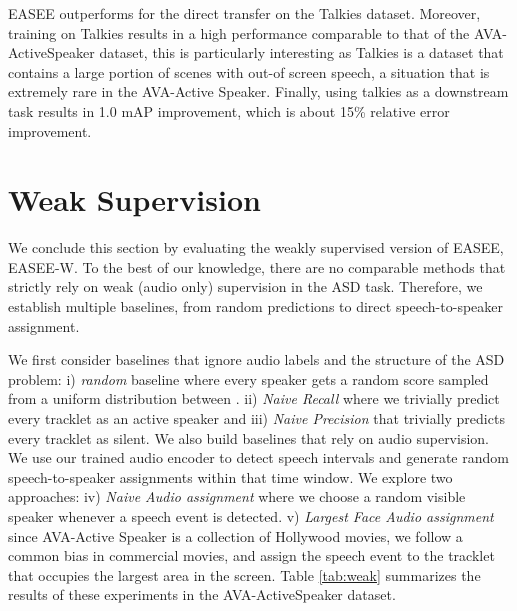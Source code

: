 \documentclass[10pt,twocolumn,letterpaper]{article}
\begin{document}
EASEE outperforms \cite{leon2021maas} for the direct transfer on the Talkies dataset. Moreover,  training on Talkies results in a high performance comparable to that of the AVA-ActiveSpeaker dataset, this is particularly interesting as Talkies is a dataset that contains a large portion of scenes with out-of screen speech, a situation that is extremely rare in the AVA-Active Speaker. Finally, using talkies as a downstream task results in 1.0 mAP improvement, which is about 15\% relative error improvement.












 
\section{Weak Supervision}
\label{subsec:weaksupervision}
We conclude this section by evaluating the weakly supervised version of EASEE, \ie EASEE-W. To the best of our knowledge, there are no comparable methods that strictly rely on weak (audio only) supervision in the ASD task. Therefore, we establish multiple baselines, from random predictions to direct speech-to-speaker assignment. 

We first consider baselines that ignore audio labels and the structure of the ASD problem: i) \textit{random} baseline where every speaker gets a random score sampled from a uniform distribution between .  ii) \textit{Naive Recall} where we trivially predict every tracklet as an active speaker and iii) \textit{Naive Precision} that trivially predicts every tracklet as silent. We also build baselines that rely on audio supervision. We use our trained audio encoder  to detect speech intervals and generate random speech-to-speaker assignments within that time window. We explore two approaches: iv) \textit{Naive Audio assignment} where we choose a random visible speaker whenever a speech event is detected. v) \textit{Largest Face Audio assignment} since AVA-Active Speaker is a collection of Hollywood movies, we follow a common bias in commercial movies, and assign the speech event to the tracklet that occupies the largest area in the screen. Table \ref{tab:weak} summarizes the results of these experiments in the AVA-ActiveSpeaker dataset.
\end{document}

